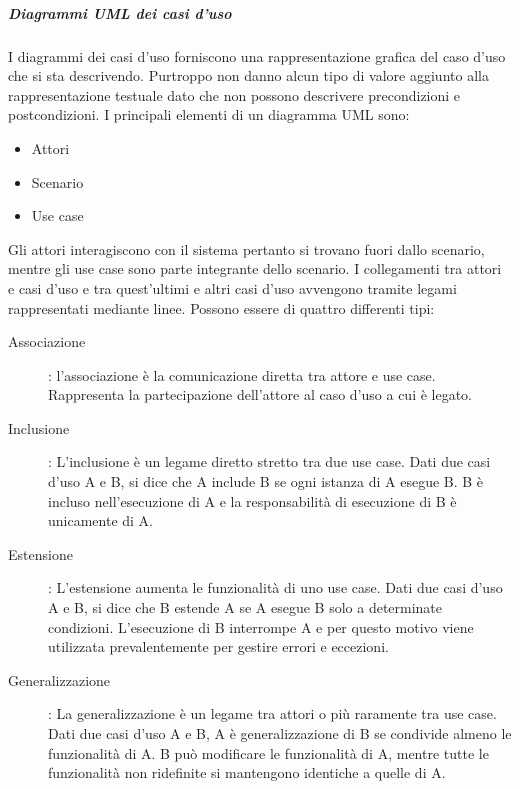 \documentclass[../norme-di-progetto.tex]{subfiles}
\begin{document}
\subparagraph{Diagrammi UML dei casi d'uso}%
\label{subp:diagrammi_UML_dei_casi_d'uso}
I diagrammi dei casi d'uso forniscono una rappresentazione grafica del caso d'uso che si sta descrivendo. Purtroppo non danno alcun tipo di valore aggiunto alla rappresentazione testuale dato che non possono descrivere precondizioni e postcondizioni. I principali elementi di un diagramma UML sono:
\begin{itemize}
  \item Attori
  \item Scenario
  \item Use case
\end{itemize}
Gli attori interagiscono con il sistema pertanto si trovano fuori dallo scenario, mentre gli use case sono parte integrante dello scenario. I collegamenti tra attori e casi d'uso e tra quest'ultimi e altri casi d'uso avvengono tramite legami rappresentati mediante linee. Possono essere di quattro differenti tipi:
\begin{description}
  \item [Associazione]: l'associazione è la comunicazione diretta tra attore e use case. Rappresenta la partecipazione dell'attore al caso d'uso a cui è legato.
  \item [Inclusione]: L'inclusione è un legame diretto stretto tra due use case. Dati due casi d'uso A e B, si dice che A include B se ogni istanza di A esegue B. B è incluso nell'esecuzione di A e la responsabilità di esecuzione di B è unicamente di A.
  \item [Estensione]: L'estensione aumenta le funzionalità di uno use case. Dati due casi d'uso A e B, si dice che B estende A se A esegue B solo a determinate condizioni. L'esecuzione di B interrompe A e per questo motivo viene utilizzata prevalentemente per gestire errori e eccezioni.
  \item [Generalizzazione]: La generalizzazione è un legame tra attori o più raramente tra use case. Dati due casi d'uso A e B, A è generalizzazione di B se condivide almeno le funzionalità di A. B può modificare le funzionalità di A, mentre tutte le funzionalità non ridefinite si mantengono identiche a quelle di A.
\end{description}
\end{document}
